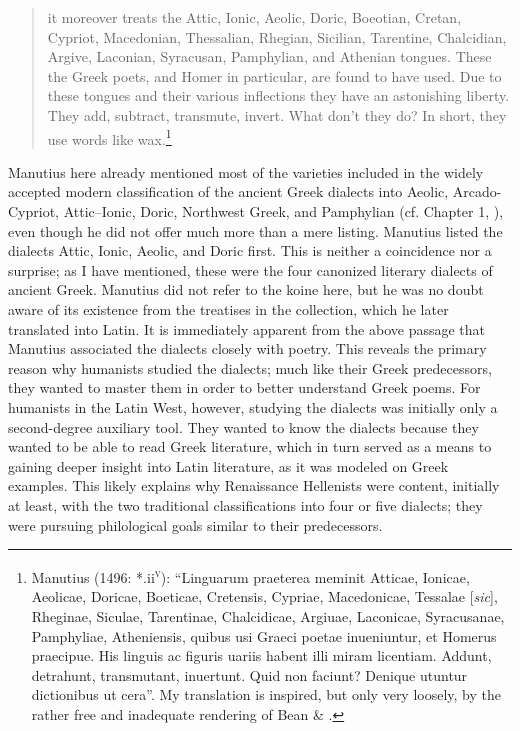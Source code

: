 \begin{quote}
it moreover treats the Attic, Ionic, Aeolic, Doric, Boeotian, Cretan, Cypriot, Macedonian, Thessalian, Rhegian, Sicilian, Tarentine, Chalcidian, Argive, Laconian, Syracusan, Pamphylian, and Athenian tongues. These the Greek poets, and Homer in particular, are found to have used. Due to these tongues and their various inflections they have an astonishing liberty. They add, subtract, transmute, invert. What don’t they do? In short, they use words like wax.\footnote{Manutius (1496: *.ii\textsc{\textsuperscript{v}}): “Linguarum praeterea meminit Atticae, Ionicae, Aeolicae, Doricae, Boeticae, Cretensis, Cypriae, Macedonicae, Tessalae [\textit{sic}], Rheginae, Siculae, Tarentinae, Chalcidicae, Argiuae, Laconicae, Syracusanae, Pamphyliae, Atheniensis, quibus usi Graeci poetae inueniuntur, et Homerus praecipue. His linguis ac figuris uariis habent illi miram licentiam. Addunt, detrahunt, transmutant, inuertunt. Quid non faciunt? Denique utuntur dictionibus ut cera”. My translation is inspired, but only very loosely, by the rather free and inadequate rendering of Bean \& \citet[12]{Lemke1958}.}
\end{quote}

Manutius here already mentioned most of the varieties included in the widely accepted modern classification of the ancient Greek dialects into Aeolic, Arcado-Cypriot, Attic–Ionic, Doric, Northwest Greek, and Pamphylian (cf. Chapter 1, ), even though he did not offer much more than a mere listing. Manutius listed the dialects Attic, Ionic, Aeolic, and Doric first. This is neither a coincidence nor a surprise; as I have mentioned, these were the four canonized literary dialects of ancient Greek. Manutius did not refer to the koine here, but he was no doubt aware of its existence from the treatises in the collection, which he later translated into Latin. It is immediately apparent from the above passage that Manutius associated the dialects closely with poetry. This reveals the primary reason why humanists studied the dialects; much like their Greek predecessors, they wanted to master them in order to better understand Greek poems. For humanists in the Latin West, however, studying the dialects was initially only a second-degree auxiliary tool. They wanted to know the dialects because they wanted to be able to read Greek literature, which in turn served as a means to gaining deeper insight into Latin literature, as it was modeled on Greek examples. This likely explains why Renaissance Hellenists were content, initially at least, with the two traditional classifications into four or five dialects; they were pursuing philological goals similar to their predecessors.

